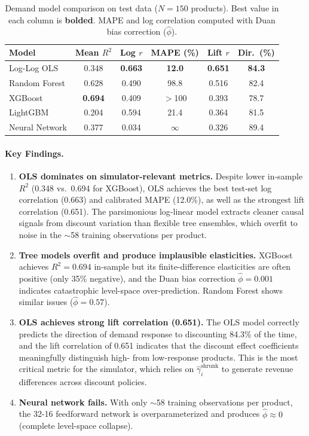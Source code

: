 \documentclass[12pt,a4paper]{article}
\begin{document}
\begin{table}[H]
\centering
\caption{Demand model comparison on test data ($N = 150$ products).
Best value in each column is \textbf{bolded}. MAPE and log
correlation computed with Duan bias correction ($\hat{\phi}$).}
\label{tab:model-comparison}
\begin{tabular}{l ccc cc}
\toprule
\textbf{Model} &
\textbf{Mean $R^2$} &
\textbf{Log $r$} &
\textbf{MAPE (\%)} &
\textbf{Lift $r$} &
\textbf{Dir.\ (\%)} \\
\midrule
Log-Log OLS & 0.348 & \textbf{0.663} & \textbf{12.0} & \textbf{0.651} & \textbf{84.3} \\
Random Forest & 0.628 & 0.490 & 98.8 & 0.516 & 82.4 \\
XGBoost & \textbf{0.694} & 0.409 & $>$100 & 0.393 & 78.7 \\
LightGBM & 0.204 & 0.594 & 21.4 & 0.364 & 81.5 \\
Neural Network & 0.377 & 0.034 & $\infty$ & 0.326 & 89.4 \\
\bottomrule
\end{tabular}
\end{table}

\paragraph{Key Findings.}

\begin{enumerate}[nosep]
\item \textbf{OLS dominates on simulator-relevant metrics.} Despite
lower in-sample $R^2$ (0.348 vs.\ 0.694 for XGBoost), OLS achieves
the best test-set log correlation (0.663) and calibrated MAPE
(12.0\%), as well as the strongest lift correlation (0.651). The
parsimonious log-linear model extracts cleaner causal signals from
discount variation than flexible tree ensembles, which overfit to
noise in the $\sim$58 training observations per product.

\item \textbf{Tree models overfit and produce implausible
elasticities.} XGBoost achieves $R^2 = 0.694$ in-sample but its
finite-difference elasticities are often positive (only 35\%
negative), and the Duan bias correction $\hat{\phi} = 0.001$
indicates catastrophic level-space over-prediction. Random Forest
shows similar issues ($\hat{\phi} = 0.57$).

\item \textbf{OLS achieves strong lift correlation (0.651).} The
OLS model correctly predicts the direction of demand response to
discounting 84.3\% of the time, and the lift correlation of 0.651
indicates that the discount effect coefficients meaningfully
distinguish high- from low-response products. This is the most
critical metric for the simulator, which relies on
$\hat{\gamma}_i^{\text{shrunk}}$ to generate revenue differences
across discount policies.

\item \textbf{Neural network fails.} With only $\sim$58 training
observations per product, the 32-16 feedforward network is
overparameterized and produces $\hat{\phi} \approx 0$ (complete
level-space collapse).
\end{enumerate}
\end{document}
